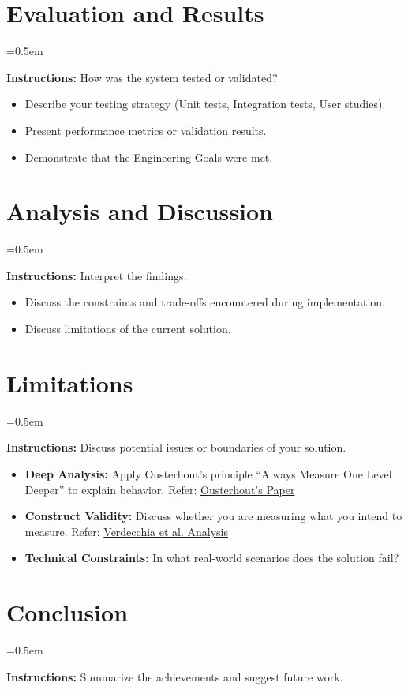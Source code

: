 \documentclass[conference]{IEEEtran}
\newcommand{\instruction}[1]{%
    \begin{list}{}{%
        \leftmargin=10pt
        \rightmargin=10pt
        \topsep=0.5em
    }
    \item[]
    \begingroup
        \color{gray}\itshape
        \small
        
        \textbf{Instructions:} #1
    \endgroup
    \end{list}
}
\begin{document}
\section{Evaluation and Results}
\instruction{How was the system tested or validated?
\begin{itemize}
    \item Describe your testing strategy (Unit tests, Integration tests, User studies).
    \item Present performance metrics or validation results.
    \item Demonstrate that the Engineering Goals were met.
\end{itemize}}

\section{Analysis and Discussion}
\instruction{Interpret the findings.
\begin{itemize}
    \item Discuss the constraints and trade-offs encountered during implementation.
    \item Discuss limitations of the current solution.
\end{itemize}}

\section{Limitations}
\instruction{Discuss potential issues or boundaries of your solution.
\begin{itemize}
    \item \textbf{Deep Analysis:} Apply Ousterhout's principle ``Always Measure One Level Deeper'' to explain behavior. Refer: \href{https://dl.acm.org/doi/10.1145/3213770}{Ousterhout's Paper}
    \item \textbf{Construct Validity:} Discuss whether you are measuring what you intend to measure. Refer: \href{https://dl.acm.org/doi/10.1145/3530019.3530020}{Verdecchia et al. Analysis}
    \item \textbf{Technical Constraints:} In what real-world scenarios does the solution fail?
\end{itemize}}

\section{Conclusion}
\instruction{Summarize the achievements and suggest future work.}
\end{document}
